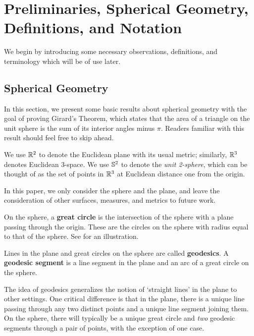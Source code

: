 \section{Preliminaries, Spherical Geometry, Definitions, and Notation}\label{sec:prelims}

We begin by introducing some necessary observations, definitions, and terminology
which will be of use later.  
\subsection{Spherical Geometry}

In this section, we present some basic results about spherical geometry with the goal of proving Girard's Theorem, which states that the area of a triangle on the unit sphere is the sum of its interior angles minus $\pi$.  Readers familiar with this result should feel free to skip ahead.



We use $\mathbb{R}^2$ to denote the 
Euclidean plane with its usual metric;
similarly, $\mathbb{R}^3$ denotes Euclidean 3-space.  We use $\mathbb{S}^2$ to denote the \textit{unit 2-sphere}, which can be 
thought of as the set of points in $\mathbb{R}^3$ at Euclidean distance one from the origin.  
 
In this paper, we only consider the sphere and the plane, and leave the consideration of other surfaces, measures, and metrics to future work.







\begin{definition}
{On the sphere, a \textbf{great circle} is the intersection of the sphere with a plane passing through the origin.} These are the circles on the sphere with radius equal to that of the sphere.  See  for an illustration.
\end{definition}

\begin{definition}

Lines in the plane and great circles on the sphere are called \textbf{geodesics}.  A \textbf{geodesic segment} is a line segment in the plane and an arc of a great circle on the sphere.
	
\end{definition}  


{The idea of {geodesics} generalizes the notion of `straight lines' in the plane to other settings.} One critical difference is that in the plane, there is a unique line passing through any two distinct points and a unique line segment joining them.  On the sphere, there will typically be a unique great circle and \textit{two} geodesic segments through a pair of points, with the exception of one case.









